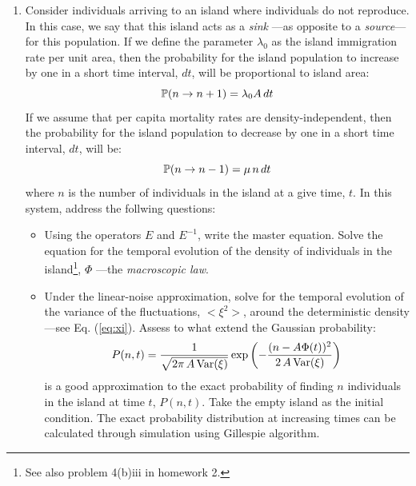\begin{enumerate}
\item Consider individuals arriving to an island where individuals do not reproduce. In this case, we say that this island acts as a {\em sink} ---as opposite to a {\em source}--- for this population. If we define the parameter $\lambda_0$ as the island immigration rate per unit area, then the probability for the island population to increase by one in a short time interval, $dt$, will be proportional to island area:
\begin{equation}
  {\mathbb P}(n \rightarrow n + 1) = \lambda_0 A\, dt 
\end{equation} 
If we assume that per capita mortality rates are density-independent, then the probability for the island population to decrease by one in a short time interval, $dt$, will be:  
\begin{equation}
  {\mathbb P}(n \rightarrow n - 1) = \mu \,n\, dt 
\end{equation}  
where $n$ is the number of individuals in the island at a give time, $t$. In this system, address the follwing questions: 
\begin{itemize} 
\item Using the operators $E$ and $E^{-1}$, write the master equation. Solve the equation for the temporal evolution of the density of individuals in the island\footnote{See also problem 4(b)iii in homework 2.}, $\Phi$ ---the {\em macroscopic law}. 
\item Under the linear-noise approximation, solve for the temporal evolution of the variance of the fluctuations,  $<\xi^2>$, around the deterministic density ---see Eq. (\ref{eq:xi}). Assess to what extend the Gaussian probability:
\begin{equation}
  P(n,t) = \frac{1}{\sqrt{2\pi\,A\,\textup{Var}(\xi)}}\exp\left(-\frac{(n-A\Phi(t))^2}{2\,A\,\textup{Var}(\xi)}\right)
\end{equation} 
is a good approximation to the exact probability of finding $n$ individuals in the island at time $t$, $P(n,t)$. Take the empty island as the initial condition. The exact probability distribution at increasing times can be calculated through simulation using Gillespie algorithm. 
\end{itemize}


\end{enumerate}
